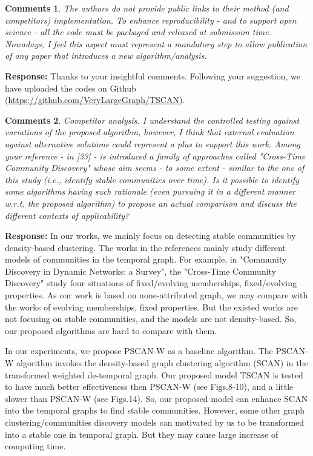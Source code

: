 \documentclass{article}
\newtheorem{Comments}{\textbf{Comments}}
\begin{document}
\begin{Comments}
The authors do not provide public links to their method (and competitors) implementation. To enhance reproducibility - and to support open science - all the code must be packaged and released at submission time. Nowadays, I feel this aspect must represent a mandatory step to allow publication of any paper that introduces a new algorithm/analysis.	
\end{Comments}
\noindent \textbf{Response: } Thanks to your insightful comments. Following your suggestion, we have uploaded the codes on Github (\url{https://github.com/VeryLargeGraph/TSCAN}).



\begin{Comments}
Competitor analysis. I understand the controlled testing against variations of the proposed algorithm, however, I think that external evaluation against alternative solutions could represent a plus to support this work. Among your reference - in [33] - is introduced a family of approaches called "Cross-Time Community Discovery" whose aim seems - to some extent - similar to the one of this study (i.e., identify stable communities over time). Is it possible to identify some algorithms having such rationale (even pursuing it in a different manner w.r.t. the proposed algorithm) to propose an actual comparison and discuss the different contexts of applicability?
\end{Comments}
\noindent \textbf{Response: } In our works, we mainly focus on detecting stable communities by density-based clustering. The works in the references mainly study different models of communities in the temporal graph. For example, in "Community Discovery in Dynamic Networks: a Survey", the "Cross-Time Community Discovery" study four situations of fixed/evolving memberships, fixed/evolving properties. As our work is based on none-attributed graph, we may compare with the works of evolving memberships, fixed properties. But the existed works are not focusing on stable communities, and the models are not density-based. So, our proposed algorithms are hard to compare with them.

In our experiments, we propose PSCAN-W as a baseline algorithm. The PSCAN-W algorithm invokes the density-based graph clustering algorithm (SCAN) in the transformed weighted de-temporal graph. Our proposed model TSCAN is tested to have much better effectiveness then PSCAN-W (see Figs.8-10), and a little slower than PSCAN-W (see Figs.14). So, our proposed model can enhance SCAN into the temporal graphs to find stable communities. However, some other graph clustering/communities discovery models can motivated by us to be transformed into a stable one in temporal graph. But they may cause large increase of computing time.
\end{document}
